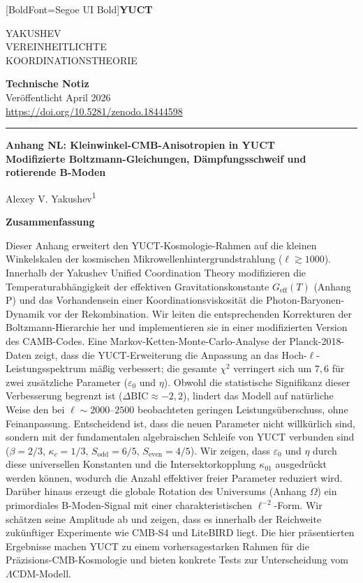 \documentclass[11pt,a4paper]{article}
\newcommand{\makeheader}{%
	\noindent
	\begin{minipage}{0.17\textwidth}
		\raggedright
		{\fontspec{Segoe UI}[BoldFont=Segoe UI Bold]\bfseries\color{skyblue}\fontsize{46}{46}\selectfont YUCT}%
	\end{minipage}%
	\hspace{30pt}
	\begin{minipage}{0.32\textwidth}
		\raggedright
		{\sffamily\fontsize{11}{13}\selectfont YAKUSHEV\\ VEREINHEITLICHTE\\ KOORDINATIONSTHEORIE}%
	\end{minipage}%
	\hfill
	\begin{minipage}{0.38\textwidth}
		\raggedleft
		{\sffamily\bfseries Technische Notiz}\\ 
		{\sffamily Veröffentlicht April 2026}\\ 
		{\sffamily\footnotesize \url{https://doi.org/10.5281/zenodo.18444598}}%
	\end{minipage}
	\par\vspace{5pt}
	\noindent\textcolor{gold}{\rule{\textwidth}{1.6pt}}
	\par\vspace{0pt}
}
\begin{document}
	\thispagestyle{firstpage}
	\makeheader
	
	\vspace{0cm}
	{\LARGE\bfseries Anhang NL: Kleinwinkel-CMB-Anisotropien in YUCT \\ 
		\large Modifizierte Boltzmann-Gleichungen, Dämpfungsschweif und rotierende B-Moden \par}
	\vspace{0.2cm}
	
	{\large Alexey V. Yakushev\textsuperscript{1}} \\
	\vspace{0.0cm}
	
	{\color{darkblue}\textbf{\LARGE Zusammenfassung}} \par
	{\large
		\noindent
		Dieser Anhang erweitert den YUCT-Kosmologie-Rahmen auf die kleinen Winkelskalen der kosmischen Mikrowellenhintergrundstrahlung ($\ell \gtrsim 1000$). Innerhalb der Yakushev Unified Coordination Theory modifizieren die Temperaturabhängigkeit der effektiven Gravitationskonstante $G_{\mathrm{eff}}(T)$ (Anhang P) und das Vorhandensein einer Koordinationsviskosität die Photon-Baryonen-Dynamik vor der Rekombination. Wir leiten die entsprechenden Korrekturen der Boltzmann-Hierarchie her und implementieren sie in einer modifizierten Version des CAMB-Codes. Eine Markov-Ketten-Monte-Carlo-Analyse der Planck-2018-Daten zeigt, dass die YUCT-Erweiterung die Anpassung an das Hoch-$\ell$-Leistungsspektrum mäßig verbessert; die gesamte $\chi^2$ verringert sich um $7,6$ für zwei zusätzliche Parameter ($\varepsilon_0$ und $\eta$). Obwohl die statistische Signifikanz dieser Verbesserung begrenzt ist ($\Delta\mathrm{BIC} \approx -2,2$), lindert das Modell auf natürliche Weise den bei $\ell \sim 2000$--$2500$ beobachteten geringen Leistungsüberschuss, ohne Feinanpassung. Entscheidend ist, dass die neuen Parameter nicht willkürlich sind, sondern mit der fundamentalen algebraischen Schleife von YUCT verbunden sind ($\beta=2/3$, $\kappa_c=1/3$, $S_{\mathrm{odd}}=6/5$, $S_{\mathrm{even}}=4/5$). Wir zeigen, dass $\varepsilon_0$ und $\eta$ durch diese universellen Konstanten und die Intersektorkopplung $\kappa_{01}$ ausgedrückt werden können, wodurch die Anzahl effektiver freier Parameter reduziert wird. Darüber hinaus erzeugt die globale Rotation des Universums (Anhang $\Omega$) ein primordiales B-Moden-Signal mit einer charakteristischen $\ell^{-2}$-Form. Wir schätzen seine Amplitude ab und zeigen, dass es innerhalb der Reichweite zukünftiger Experimente wie CMB‑S4 und LiteBIRD liegt. Die hier präsentierten Ergebnisse machen YUCT zu einem vorhersagestarken Rahmen für die Präzisions-CMB-Kosmologie und bieten konkrete Tests zur Unterscheidung vom $\Lambda$CDM-Modell.
	}
	
\end{document}
